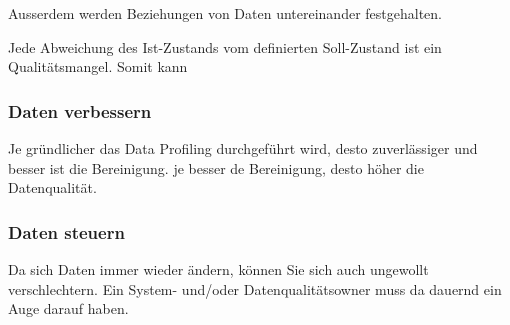 \documentclass[a4paper, 11pt]{article}
\begin{document}
Ausserdem werden Beziehungen von Daten untereinander festgehalten. 

Jede Abweichung des Ist-Zustands vom definierten Soll-Zustand ist ein Qualitätsmangel. Somit kann 

\subsubsection{Daten verbessern}
Je gründlicher das Data Profiling durchgeführt wird, desto zuverlässiger und besser ist die Bereinigung. je besser de Bereinigung, desto höher die Datenqualität.

\subsubsection{Daten steuern}
Da sich Daten immer wieder ändern, können Sie sich auch ungewollt verschlechtern. Ein System- und/oder Datenqualitätsowner muss da dauernd ein Auge darauf haben.
\end{document}
